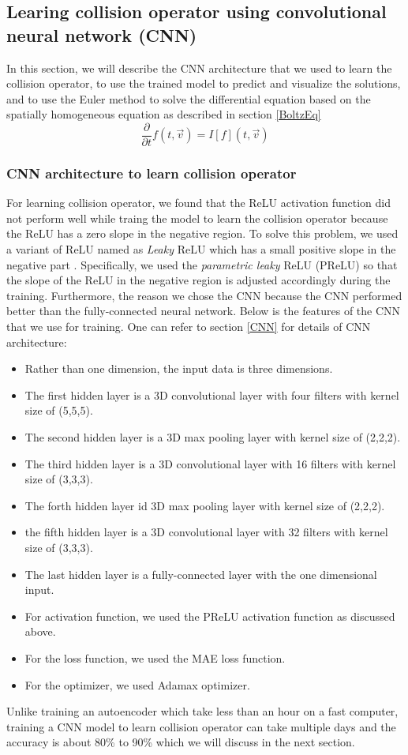 \documentclass{article}
\begin{document}
\subsection{Learing collision operator using convolutional neural network (CNN)}
In this section, we will describe the CNN architecture that we used to learn the collision operator, to use the trained model to predict and visualize the solutions, and to use the Euler method to solve the differential equation based on the spatially homogeneous equation as described in section \ref{BoltzEq}
\begin{equation}
\frac{\partial}{\partial t}f(t,\vec{v}) = I[f](t, \vec{v})
\end{equation}

\subsubsection{CNN architecture to learn collision operator}
For learning collision operator, we found that the ReLU activation function did not perform well while traing the model to learn the collision operator because the ReLU has a zero slope in the negative region. To solve this problem, we used a variant of ReLU named as \emph{Leaky} ReLU which has a small positive slope in the negative part . Specifically, we used the \emph{parametric leaky} ReLU (PReLU) so that the slope of the ReLU in the negative region is adjusted accordingly during the training. Furthermore, the reason we chose the CNN because the CNN performed better than the fully-connected neural network. Below is the features of the CNN that we use for training. One can refer to section \ref{CNN} for details of CNN architecture:

\begin{itemize}
	\item Rather than one dimension, the input data is three dimensions.
	\item The first hidden layer is a 3D convolutional layer with four filters with kernel size of (5,5,5).
	\item The second hidden layer is a 3D max pooling layer with kernel size of (2,2,2).
	\item The third hidden layer is a 3D convolutional layer with 16 filters with kernel size of (3,3,3).
	\item The forth hidden layer id 3D max pooling layer with kernel size of (2,2,2).
	\item the fifth hidden layer is a 3D convolutional layer with 32 filters with kernel size of (3,3,3).
	\item The last hidden layer is a fully-connected layer with the one dimensional input.
	\item For activation function, we used the PReLU activation function as discussed above.
	\item For the loss function, we used the MAE loss function.
	\item For the optimizer, we used Adamax optimizer.
\end{itemize}
Unlike training an autoencoder which take less than an hour on a fast computer, training a CNN model to learn collision operator can take multiple days and the accuracy is about 80\% to 90\% which we will discuss in the next section.
\end{document}
